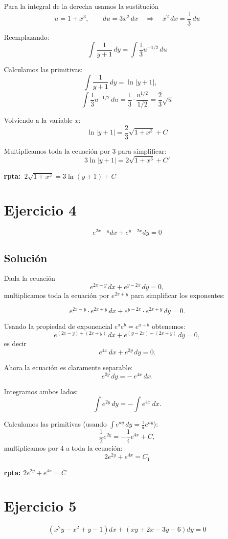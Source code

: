 \documentclass[12pt,a4paper]{article}
\begin{document}
\begin{multicols}{2}
Para la integral de la derecha usamos la sustitución
\[u=1+x^3,\qquad du=3x^2\,dx\quad\Rightarrow\quad x^2\,dx=\frac{1}{3}\,du\]

Reemplazando:
\[
\int\frac{1}{y+1}\,dy=\int\frac{1}{3}u^{-1/2}\,du
\]

Calculamos las primitivas:
\[
\int\frac{1}{y+1}\,dy=\ln|y+1|,\qquad
\]
\[
\int\frac{1}{3}u^{-1/2}\,du=\frac{1}{3}\cdot\frac{u^{1/2}}{1/2}=\frac{2}{3}\sqrt{u}
\]

Volviendo a la variable \(x\):
\[
\ln|y+1| = \frac{2}{3}\sqrt{1+x^{3}} + C
\]

Multiplicamos toda la ecuación por $3$ para simplificar:
\[
3\ln|y+1| = 2\sqrt{1+x^{3}} + C'
\]

\textbf{rpta: $\,2\sqrt{1+x^{3}} = 3\ln(y+1) + C\,$}

\columnbreak
\section*{Ejercicio 4}
\[e^{2x-y}dx+e^{y-2x}dy=0\]

\subsection*{Solución}

Dada la ecuación
\[
e^{2x-y}\,dx+e^{y-2x}\,dy=0,
\]
multiplicamos toda la ecuación por \(e^{2x+y}\) para simplificar los exponentes:

\[
e^{2x-y}\cdot e^{2x+y}\,dx + e^{y-2x}\cdot e^{2x+y}\,dy = 0.
\]

Usando la propiedad de exponencial \(e^{a}e^{b}=e^{a+b}\) obtenemos:
\[
e^{(2x-y)+(2x+y)}\,dx + e^{(y-2x)+(2x+y)}\,dy = 0,
\]
es decir
\[
e^{4x}\,dx + e^{2y}\,dy = 0.
\]

Ahora la ecuación es claramente separable:
\[
e^{2y}\,dy = -\,e^{4x}\,dx.
\]

Integramos ambos lados:
\[
\int e^{2y}\,dy = -\int e^{4x}\,dx.
\]

Calculamos las primitivas (usando \(\int e^{ay}\,dy = \frac{1}{a}e^{ay}\)):
\[
\frac{1}{2}e^{2y} = -\frac{1}{4}e^{4x} + C,
\]
multiplicamos por 4 a toda la ecuación:
\[
2e^{2y} + e^{4x} = C_1
\]

\textbf{rpta: $2e^{2y} + e^{4x} = C$}

\columnbreak
\section*{Ejercicio 5}
\[(x^2y-x^2+y-1)dx+(xy+2x-3y-6)dy=0\]


\end{multicols}
\end{document}
